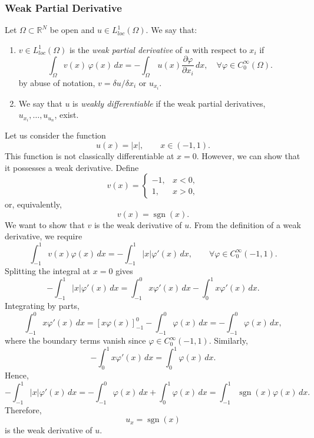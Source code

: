 \subsubsection{Weak Partial Derivative}
\begin{definition}
    Let $\Omega \subset \mathbb{R}^N$ be open and $u\in L^1_{loc}(\Omega)$. We say that:
    \begin{enumerate}
        \item[(i)]
            $v\in L^1_{loc}(\Omega)$ is the \textit{weak partial derivative} of $u$ with respect to $x_i$ if
            \[
            \int_\Omega v(x)\,\varphi(x)\, dx = - \int_\Omega \, u(x) \frac{\partial\varphi}{\partial x_i} \, dx, \quad \forall \varphi \in C^\infty_0(\Omega).
            \]
            by abuse of notation, $v = \delta u / \delta x_i$ or $u_{x_i}$.
        \item[(ii)]
            We say that $u$ is \textit{weakly differentiable} if the weak partial derivatives, $u_{x_i}, \dots , u_{u_n}$, exist.
    \end{enumerate}
\end{definition}

\begin{example}
\label{ex:Weak derivative example}
    Let us consider the function
    \[
        u(x)=|x|, \qquad x\in(-1,1).
    \]
    This function is not classically differentiable at \(x=0\). However, we can show that it possesses a weak derivative. Define
    \[
        v(x)=
        \begin{cases}
            -1, & x<0,\\
            1, & x>0,
        \end{cases}
    \]
    or, equivalently,
    \[
        v(x)=\operatorname{sgn}(x).
    \]
    We want to show that \(v\) is the weak derivative of \(u\). From the definition of a weak derivative, we require
    \[
        \int_{-1}^1 v(x)\varphi(x)\,dx
        =
        -\int_{-1}^1 |x|\varphi'(x)\,dx,
        \qquad
        \forall \varphi\in C_0^\infty(-1,1).
    \]
    Splitting the integral at \(x=0\) gives
   \[
    -\int_{-1}^1 |x|\varphi'(x)\,dx = \int_{-1}^0 x\varphi'(x)\,dx -\int_{0}^1 x\varphi'(x)\,dx.
    \]
    Integrating by parts,
    \[
    \int_{-1}^0 x\varphi'(x)\,dx = [x\varphi(x)]_{-1}^0 - \int_{-1}^0 \varphi(x)\,dx = -\int_{-1}^0 \varphi(x) \,dx,
    \]
    where the boundary terms vanish since
    \(\varphi\in C_0^\infty(-1,1)\). Similarly,
    \[
        -\int_0^1 x\varphi'(x)\,dx
        =
        \int_0^1 \varphi(x)\,dx.
    \]
    Hence,
    \[
    -\int_{-1}^1 |x|\varphi'(x)\,dx = -\int_{-1}^0 \varphi(x)\,dx  + \int_{0}^1 \varphi(x)\,dx = \int_{-1}^1 \operatorname{sgn}(x)\varphi(x)\,dx.
    \]
    Therefore,
    \[
        u_x=\operatorname{sgn}(x)
    \]
    is the weak derivative of \(u\).
\end{example}

